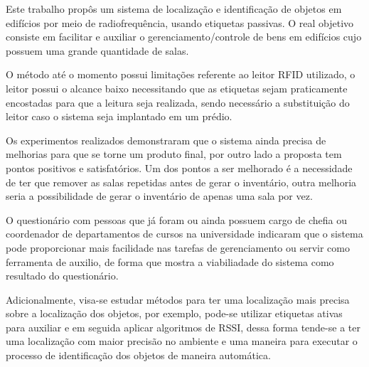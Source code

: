 
\label{chapter:consideracoes}

Este trabalho propôs um sistema de localização e identificação de objetos em edifícios por meio de
radiofrequência, usando etiquetas passivas. O real objetivo consiste em facilitar e auxiliar o gerenciamento/controle de
bens em edifícios cujo possuem uma grande quantidade de salas.


\par
O método até o momento possui limitações referente ao leitor RFID utilizado, o leitor possui o alcance baixo necessitando que as etiquetas sejam praticamente encostadas para que a leitura seja realizada, sendo necessário a substituição do leitor caso o sistema seja implantado em um prédio.
\par
Os experimentos realizados demonstraram que o sistema ainda precisa de melhorias para que se torne um produto final, por outro lado a proposta tem pontos positivos e satisfatórios. Um dos pontos a ser melhorado é a necessidade de ter que remover as salas repetidas antes de gerar o inventário, outra melhoria seria a possibilidade de gerar o inventário de apenas uma sala por vez.

\par
O questionário com pessoas que já foram ou ainda possuem cargo de chefia ou coordenador de departamentos de cursos na universidade indicaram que o sistema pode proporcionar mais facilidade nas tarefas de gerenciamento ou servir como ferramenta de auxilio, de forma que mostra a viabiliadade do sistema como resultado do questionário.
\par

Adicionalmente, visa-se estudar métodos para ter uma localização mais precisa sobre a localização dos objetos, por exemplo, pode-se utilizar etiquetas ativas para auxiliar e em seguida aplicar algoritmos de RSSI, dessa forma tende-se a ter uma localização com maior precisão no ambiente e uma maneira para executar o processo de identificação dos objetos de maneira automática. 



